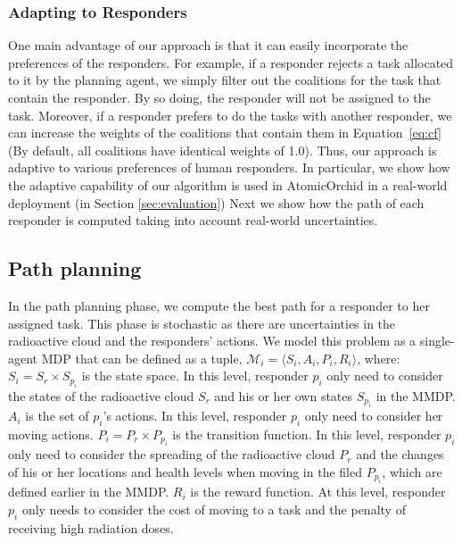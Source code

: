 \subsubsection{Adapting to Responders}
One main advantage of our approach is that it can easily
incorporate the preferences of the responders. For example, if a
responder rejects  a task allocated to it by the planning agent, we
simply filter out the coalitions for the task that contain the
responder. By so doing, the responder will not be assigned to the
task. Moreover, if a responder prefers to do the tasks with another
responder, we can increase the weights of the coalitions that
contain them in Equation~\ref{eq:cf} (By default, all coalitions
have identical weights of 1.0). Thus, our approach is adaptive to
various preferences of human responders. In particular, we show how
the adaptive capability of our algorithm is used in AtomicOrchid in
a real-world deployment (in Section \ref{sec:evaluation}) Next we
show how the path of each responder is computed taking into account
real-world uncertainties.

\subsection{Path planning}
\label{sec:pathplanning}

\noindent In the path planning phase, we compute the best path for
a responder to her assigned task. This phase is stochastic as there
are uncertainties in the radioactive cloud and the responders'
actions. We model this problem as a single-agent MDP that can be
defined as a tuple, $\mathcal{M}_i = \langle S_i, A_i, P_i, R_i
\rangle$, where: $S_i = S_r \times S_{p_i}$ is the state space. In
this level, responder $p_i$ only need to consider the states of the
radioactive cloud $S_r$ and his or her own states $S_{p_i}$ in the
MMDP. $A_i$ is the set of $p_i$'s actions. In this level, responder
$p_i$ only need to consider her moving actions. $P_i = P_r \times
P_{p_i}$ is the transition function. In this level, responder $p_i$
only need to consider the spreading of the radioactive cloud $P_r$
and the changes of his or her locations and health levels when
moving in the filed $P_{p_i}$, which are defined earlier in the
MMDP. $R_i$ is the reward function. At this level, responder $p_i$
only needs to consider the cost of moving to a task and the penalty
of receiving high radiation doses.

